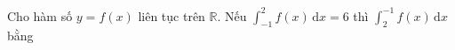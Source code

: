 \begin{ex}
Cho hàm số $y=f(x)$ liên tục trên $\mathbb R$. Nếu $\displaystyle\int_{-1}^{2}f(x)\,\mathrm dx=6$ thì $\displaystyle\int_{2}^{-1}f(x)\,\mathrm dx$ bằng
\end{ex}

